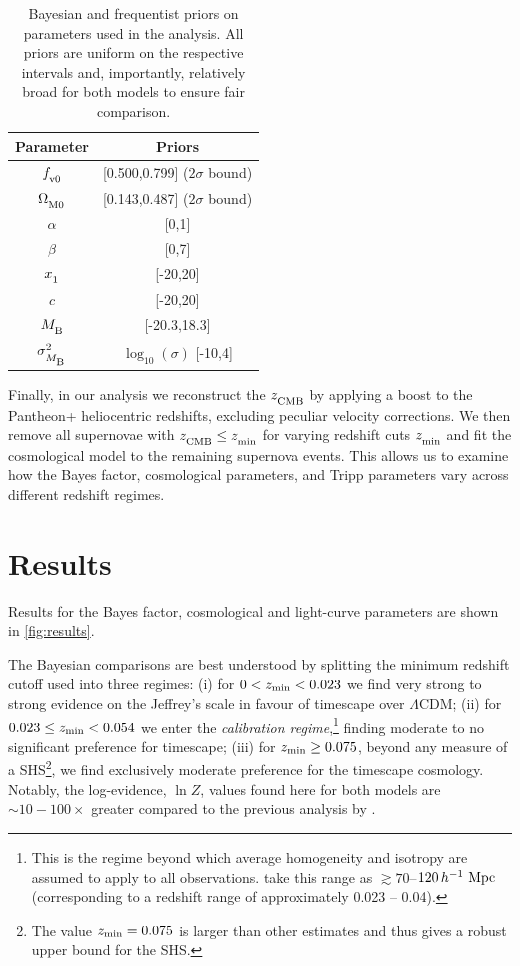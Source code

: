 \documentclass[fleqn,usenatbib,onecolumn,referee]{mnras}
\newcommand{\LA}{\Lambda}
\newcommand{\LCDM}{$\LA$CDM}
\newcommand{\Z}[1]{_{\lower2pt\hbox{$\scriptstyle#1$}}}
\newcommand{\Ns}[1]{_{\lower2pt\hbox{$\scriptstyle\rm#1$}}}
\newcommand{\w}[1]{\mathop{\hbox{\,#1}}}
\newcommand{\gsim}{\gtrsim}
\newcommand{\h}{\,h^{-1}}
\newcommand{\hM}{\h\w{Mpc}}
\newcommand{\ns}[1]{_{\rm #1}}
\newcommand{\zmin}{z\ns{min}}
\begin{document}
\begin{table}
\centering
\caption{Bayesian and frequentist priors on parameters used in the analysis. All priors are uniform on the respective intervals and, importantly, relatively broad for both models to ensure fair comparison.}
\begin{tabular}{c | c  } 
    \hline
     Parameter & Priors \\ %
    \hline
    \hline
    $f\Ns{v0}$ & [0.500,0.799] ($2 \sigma$ bound) \\ [0.8ex]
    $\Omega\Ns{M0}$ & [0.143,0.487] ($2 \sigma$ bound) \\ [0.8ex]
    $\alpha$ & [0,1] \\ [0.8ex] 
    $\beta$ & [0,7] \\ [0.8ex] 
    $x\Z 1$ & [-20,20] \\ [0.8ex] 
    $c$ & [-20,20] \\ [0.8ex] 
    $M\Ns{B}$ & [-20.3,18.3] \\ [0.8ex] 
    $\sigma\Z{M\Ns{B}}^2$ & $\log_{10}(\sigma)$ [-10,4] \\ [0.8ex] 
    \hline
\end{tabular}
\label{tab:priors}
\end{table}

Finally, in our analysis we reconstruct the $z \Ns {CMB}$ by applying a boost \citep{Fixsen_1996} to the Pantheon+ heliocentric redshifts, excluding peculiar velocity corrections. We then remove all supernovae with $z \Ns {CMB} \leq z \Ns {min}$ for varying redshift cuts $z\Ns {min}$ and fit the cosmological model to the remaining supernova events. This allows us to examine how the Bayes factor, cosmological parameters, and Tripp parameters vary across different redshift regimes.

\section{Results}\label{sec:results}

Results for the Bayes factor, cosmological and light-curve parameters are shown in \cref{fig:results}.

The Bayesian comparisons are best understood by splitting the minimum redshift cutoff used into three regimes: (i) for $0< \zmin < 0.023$ we find very strong to strong evidence on the Jeffrey's scale \citep{Kass_1995} in favour of timescape over \LCDM; (ii) for $0.023\leq \zmin < 0.054$ we enter the \textit{calibration regime},\footnote{This is the regime beyond which average homogeneity and isotropy are assumed to apply to all observations. \citet{Hogg_2005, Scrimgeour_2012} take this range as $\gsim70$--$120\hM$ (corresponding to a redshift range of approximately 0.023 -- 0.04).} finding moderate to no significant preference for timescape; (iii) for $\zmin \geq 0.075$, beyond any measure of a SHS\footnote{The \citet{Lane_2023} value $\zmin=0.075$ is larger than other estimates and thus gives a robust upper bound for the SHS.}, we find exclusively moderate preference for the timescape cosmology. Notably, the log-evidence, $\ln Z$, values found here for both models are $\sim 10-100\times$ greater compared to the previous analysis by \citet{Lane_2023}.
\end{document}
